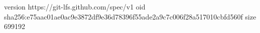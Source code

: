 version https://git-lfs.github.com/spec/v1
oid sha256:e75aac01ae0ac9e3872df9e36d78396f55ade2a9c7c006f28a517010cbfd560f
size 699192
